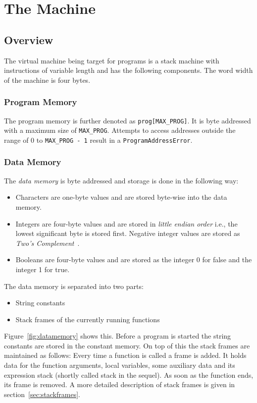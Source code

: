 \chapter{The \leongage{} Machine}
\lstset{language=AsmDef}
\section{Overview}
The virtual machine being target for \leongage{} programs is a stack machine with instructions of variable length and has the following components. The word width of the \leongage{} machine is four bytes.

\subsection{Program Memory}
The program memory is further denoted as \lstinline$prog[MAX_PROG]$. It is byte addressed with a maximum size of \lstinline$MAX_PROG$. Attempts to access addresses outside the range of 0 to \lstinline$MAX_PROG - 1$ result in a \lstinline$ProgramAddressError$.

\subsection{Data Memory}
The {\em data memory} is byte addressed and storage is done in the following way:

\begin{itemize}
\item Characters are one-byte values and are stored byte-wise into the data memory.
\item Integers are four-byte values and are stored in {\em little endian order} i.e., the lowest significant byte is stored first. Negative integer values are stored as {\em Two's Complement}~\cite{wikipedia_twos_2016}.
\item Booleans are four-byte values and are stored as the integer 0 for false and the integer 1 for true.
\end{itemize}
 The data memory is separated into two parts:
	\begin{itemize}
		\item String constants
		\item Stack frames of the currently running functions
	\end{itemize}
	Figure~\ref{fig:datamemory} shows this. Before a program is started the string constants are stored in the constant memory. On top of this the stack frames are maintained as follows: Every time a function is called a frame is added. It holds data for the function arguments, local variables, some auxiliary data and its expression stack (shortly called stack in the sequel). As soon as the function ends, its frame is removed. A more detailed description of stack frames is given in section~\ref{sec:stackframes}.


